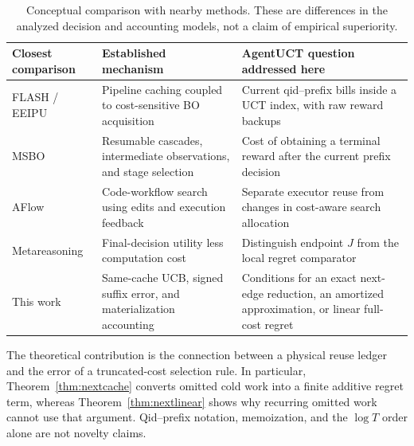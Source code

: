 \begin{table}[t]
\centering
\small
\begin{tabularx}{\textwidth}{@{}l >{\raggedright\arraybackslash}X >{\raggedright\arraybackslash}X@{}}
\toprule
Closest comparison & Established mechanism & AgentUCT question addressed here\\
\midrule
FLASH / EEIPU & Pipeline caching coupled to cost-sensitive BO acquisition & Current qid--prefix bills inside a UCT index, with raw reward backups\\
MSBO & Resumable cascades, intermediate observations, and stage selection & Cost of obtaining a terminal reward after the current prefix decision\\
AFlow & Code-workflow search using edits and execution feedback & Separate executor reuse from changes in cost-aware search allocation\\
Metareasoning & Final-decision utility less computation cost & Distinguish endpoint $J$ from the local regret comparator\\
This work & Same-cache UCB, signed suffix error, and materialization accounting & Conditions for an exact next-edge reduction, an amortized approximation, or linear full-cost regret\\
\bottomrule
\end{tabularx}
\caption{Conceptual comparison with nearby methods. These are differences in the analyzed decision and accounting models, not a claim of empirical superiority.}
\label{tab:related}
\end{table}

The theoretical contribution is the connection between a physical reuse ledger and the error of a truncated-cost selection rule. In particular, Theorem~\ref{thm:nextcache} converts omitted cold work into a finite additive regret term, whereas Theorem~\ref{thm:nextlinear} shows why recurring omitted work cannot use that argument. Qid--prefix notation, memoization, and the $\log T$ order alone are not novelty claims.
